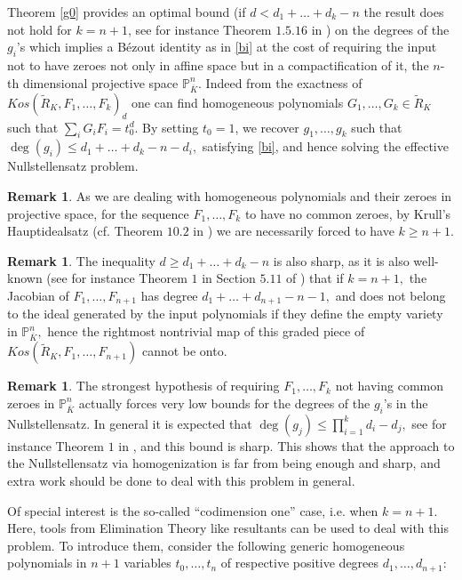 \documentclass[a4paper,11pt]{amsart}
\renewcommand{\P}{\mathbb{P}}
\newcounter{thm}
\numberwithin{thm}{section}
\numberwithin{equation}{section}
\theoremstyle{definition}
\newtheorem{remark}[thm]{Remark}
\theoremstyle{plain}
\begin{document}
Theorem \ref{g0} provides an optimal bound (if $d< d_1+\ldots+d_k-n$ the result does not hold for $k=n+1$, see for instance Theorem $1.5.16$ in \cite{CD05a}) on the degrees of the $g_i$'s which implies a B\'ezout identity as in \eqref{bi} at the cost of requiring the input not to have zeroes not only in affine space but in a compactification of it, the $n$-th dimensional projective space $\P^n_{\overline{K}}.$  Indeed from the exactness of  $Kos(\tilde{R}_K,F_1,\ldots, F_k)_d$ one can find homogeneous polynomials $G_1,\ldots, G_k\in \tilde{R}_K$ such that
$\sum_i G_iF_i = t_0^d.$ By setting $t_0=1$, we recover $g_1,\ldots, g_k$ such that $\deg(g_i)\leq d_1+\ldots+d_k-n-d_i,$ satisfying \eqref{bi}, and hence solving the effective Nullstellensatz problem.
\begin{remark}
As we are dealing with homogeneous polynomials and their zeroes in projective space, for the sequence
$F_1,\ldots, F_k$ to have no common zeroes, by Krull's Hauptidealsatz (cf. Theorem $10.2$ in \cite{eis95}) we are necessarily forced to have $k\geq n+1.$
\end{remark}

\begin{remark}
The inequality $d\geq d_1+\ldots+d_k-n$ is also sharp, as it is also well-known (see for instance Theorem $1$ in Section $5.11$ of \cite{AGV85}) that if $k=n+1,$ the Jacobian of $F_1,\ldots, F_{n+1}$ has degree $d_1+\ldots+d_{n+1}-n-1,$ and does not belong to the ideal generated by the input polynomials if they define the empty variety in $\P^n_{\overline{K}},$ hence the rightmost nontrivial map of this graded piece of $Kos(\tilde{R}_K,F_1,\ldots, F_{n+1})$ cannot be onto.
\end{remark}

\begin{remark}\label{naiv}
The strongest hypothesis of requiring $F_1,\ldots, F_k$ not having common zeroes in $\P^n_{\overline{K}}$ actually forces very low bounds for the degrees of the $g_i$'s in the Nullstellensatz. In general it is expected that  $\deg(g_j)\leq \prod_{i=1}^k d_i-d_j,$ see for instance Theorem $1$ in \cite{DKS13}, and this bound is sharp. This shows that the approach to the Nullstellensatz via homogenization is far from being enough and sharp, and extra work should be done to deal with this problem in general.
\end{remark}

Of special interest is the so-called ``codimension one'' case, i.e. when $k=n+1.$ Here,  tools from Elimination Theory like resultants can be used to deal with this problem. To introduce them, consider the following generic homogeneous polynomials in $n+1$ variables $t_0,\ldots, t_n$ of respective positive degrees $d_1,\ldots, d_{n+1}:$
\end{document}
